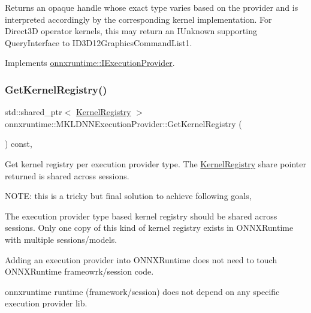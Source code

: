 Returns an opaque handle whose exact type varies based on the provider and is interpreted accordingly by the corresponding kernel implementation. For Direct3D operator kernels, this may return an I\+Unknown supporting Query\+Interface to I\+D3\+D12\+Graphics\+Command\+List1. 

Implements \mbox{\hyperlink{classonnxruntime_1_1IExecutionProvider_aebaeab04945539bc5db5942b63684ccb}{onnxruntime\+::\+I\+Execution\+Provider}}.

\mbox{\label{classonnxruntime_1_1MKLDNNExecutionProvider_ad6f1e4b2ef0355a8f6b9c8fd866257ef}} 
\subsubsection{\texorpdfstring{Get\+Kernel\+Registry()}{GetKernelRegistry()}}
{\footnotesize\ttfamily std\+::shared\+\_\+ptr$<$ \mbox{\hyperlink{classonnxruntime_1_1KernelRegistry}{Kernel\+Registry}} $>$ onnxruntime\+::\+M\+K\+L\+D\+N\+N\+Execution\+Provider\+::\+Get\+Kernel\+Registry (\begin{DoxyParamCaption}{ }\end{DoxyParamCaption}) const\hspace{0.3cm}{\ttfamily [override]}, {\ttfamily [virtual]}}

Get kernel registry per execution provider type. The \mbox{\hyperlink{classonnxruntime_1_1KernelRegistry}{Kernel\+Registry}} share pointer returned is shared across sessions.

N\+O\+TE\+: this is a tricky but final solution to achieve following goals,
\begin{DoxyEnumerate}
\item The execution provider type based kernel registry should be shared across sessions. Only one copy of this kind of kernel registry exists in O\+N\+N\+X\+Runtime with multiple sessions/models.
\item Adding an execution provider into O\+N\+N\+X\+Runtime does not need to touch O\+N\+N\+X\+Runtime frameowrk/session code.
\item onnxruntime runtime (framework/session) does not depend on any specific execution provider lib. 
\end{DoxyEnumerate}


